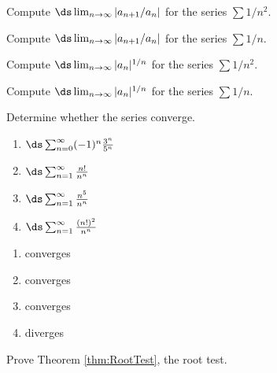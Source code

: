 \begin{enumialphparenastyle}

\begin{ex}
Compute $\ds\lim_{n\to\infty} |a_{n+1}/a_n|$ for the series
$\sum 1/n^2$.
\end{ex}

\begin{ex}
Compute $\ds\lim_{n\to\infty} |a_{n+1}/a_n|$ for the series
$\sum 1/n$.
\end{ex}

\begin{ex}
Compute $\ds\lim_{n\to\infty} |a_n|^{1/n}$ for the series
$\sum 1/n^2$.
\end{ex}

\begin{ex}
Compute $\ds\lim_{n\to\infty} |a_n|^{1/n}$ for the series
$\sum 1/n$.
\end{ex}

\begin{ex}
Determine whether the series converge.

\begin{multicols}{2}
\begin{enumerate}
	\item $\ds\sum_{n=0}^\infty (-1)^{n}{3^n\over 5^n}$
	\item $\ds\sum_{n=1}^\infty {n!\over n^n}$
	\item $\ds\sum_{n=1}^\infty {n^5\over n^n}$
	\item $\ds\sum_{n=1}^\infty {(n!)^2\over n^n}$
\end{enumerate}
\end{multicols}
\begin{sol}
\begin{enumerate}
	\item converges
	\item converges
	\item converges
	\item diverges
\end{enumerate}
\end{sol}
\end{ex}

\begin{ex}
Prove Theorem \ref{thm:RootTest}, the root test.
\end{ex}

\end{enumialphparenastyle}